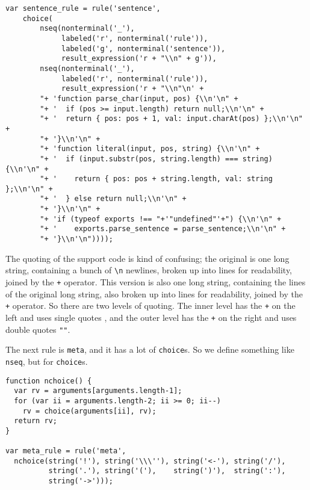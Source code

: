 \documentclass[
]{article}
\begin{document}
\begin{verbatim}
var sentence_rule = rule('sentence',
    choice(
        nseq(nonterminal('_'),
             labeled('r', nonterminal('rule')),
             labeled('g', nonterminal('sentence')),
             result_expression('r + "\\n" + g')),
        nseq(nonterminal('_'),
             labeled('r', nonterminal('rule')),
             result_expression('r + "\\n"\n' +
        "+ 'function parse_char(input, pos) {\\n'\n" +
        "+ '  if (pos >= input.length) return null;\\n'\n" +
        "+ '  return { pos: pos + 1, val: input.charAt(pos) };\\n'\n" +
        "+ '}\\n'\n" +
        "+ 'function literal(input, pos, string) {\\n'\n" +
        "+ '  if (input.substr(pos, string.length) === string) {\\n'\n" +
        "+ '    return { pos: pos + string.length, val: string };\\n'\n" +
        "+ '  } else return null;\\n'\n" +
        "+ '}\\n'\n" +
        "+ 'if (typeof exports !== "+'"undefined"'+") {\\n'\n" +
        "+ '    exports.parse_sentence = parse_sentence;\\n'\n" +
        "+ '}\\n'\n"))));
\end{verbatim}

The quoting of the support code is kind of confusing; the original is
one long string, containing a bunch of \texttt{\textbackslash{}n}
newlines, broken up into lines for readability, joined by the \texttt{+}
operator. This version is also one long string, containing the lines of
the original long string, also broken up into lines for readability,
joined by the \texttt{+} operator. So there are two levels of quoting.
The inner level has the \texttt{+} on the left and uses single quotes
\texttt{\textquotesingle{}\textquotesingle{}}, and the outer level has
the \texttt{+} on the right and uses double quotes \texttt{""}.

The next rule is \texttt{meta}, and it has a lot of \texttt{choice}s. So
we define something like \texttt{nseq}, but for \texttt{choice}s.

\begin{verbatim}
function nchoice() {
  var rv = arguments[arguments.length-1];
  for (var ii = arguments.length-2; ii >= 0; ii--)
    rv = choice(arguments[ii], rv);
  return rv;
}

var meta_rule = rule('meta',
  nchoice(string('!'), string('\\\''), string('<-'), string('/'),
          string('.'), string('('),    string(')'),  string(':'),
          string('->')));
\end{verbatim}
\end{document}
